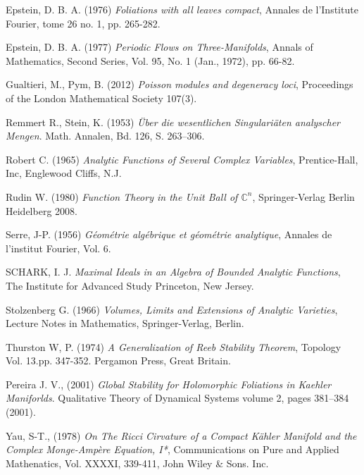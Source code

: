 \documentclass[letterpaper]{report}
\newcommand{\con}{\ensuremath{\mathbb{C}^n}}
\begin{document}
\begin{thebibliography}{3}
 Epstein, D. B. A. (1976) \textit{Foliations with all leaves compact}, Annales de l'Institute Fourier, 
tome 26 no. 1, pp. 265-282.

 Epstein, D. B. A. (1977) \textit{Periodic Flows on Three-Manifolds}, Annals of Mathematics, 
Second Series, Vol. 95, No. 1 (Jan., 1972), pp. 66-82.

 Gualtieri, M., Pym, B. (2012) \textit{Poisson modules and degeneracy loci},
Proceedings of the London Mathematical Society 107(3).

 Remmert R., Stein, K. (1953) \textit{Über die wesentlichen
Singulariäten analyscher Mengen}. Math. Annalen, Bd. 126, S. 263--306.

 Robert C. (1965) \textit{Analytic Functions of Several
Complex Variables}, Prentice-Hall, Inc, Englewood Cliffs, N.J.

 Rudin W. (1980) \textit{Function Theory in the Unit Ball of
$\con$}, Springer-Verlag Berlin Heidelberg 2008.

 Serre, J-P. (1956) \textit{G\'eom\'etrie alg\'ebrique et
g\'eom\'etrie analytique}, Annales de l'institut Fourier, Vol. 6. 

 SCHARK, I. J. \textit{Maximal Ideals in an Algebra of Bounded Analytic Functions}, The Institute for Advanced Study
Princeton, New Jersey.

 Stolzenberg G. (1966) \textit{Volumes, Limits and
Extensions of Analytic Varieties}, Lecture Notes in Mathematics,
Springer-Verlag, Berlin. 

 Thurston W, P. (1974) \textit{A Generalization of Reeb Stability Theorem}, Topology Vol. 13.pp. 347-352.
Pergamon Press, Great Britain.

 Pereira J. V., (2001) \textit{Global Stability for Holomorphic Foliations in Kaehler Maniforlds}. 
Qualitative Theory of Dynamical Systems volume 2, pages 381–384 (2001).

 Yau, S-T., (1978) \textit{On The Ricci Cirvature of a Compact K\"ahler Manifold and the Complex Monge-Amp\`ere Equation, I*},
Communications on Pure and Applied Mathenatics, Vol. XXXXI, 339-411, John Wiley \& Sons. Inc.
\end{thebibliography}
\end{document}
